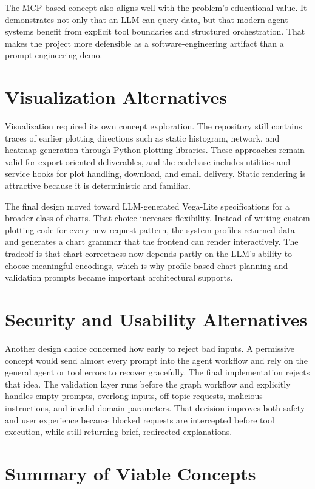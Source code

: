 \documentclass[12pt,oneside]{report}
\begin{document}
The MCP-based concept also aligns well with the problem's educational value. It demonstrates not only that an LLM can query data, but that modern agent systems benefit from explicit tool boundaries and structured orchestration. That makes the project more defensible as a software-engineering artifact than a prompt-engineering demo.

\section{Visualization Alternatives}

Visualization required its own concept exploration. The repository still contains traces of earlier plotting directions such as static histogram, network, and heatmap generation through Python plotting libraries. These approaches remain valid for export-oriented deliverables, and the codebase includes utilities and service hooks for plot handling, download, and email delivery. Static rendering is attractive because it is deterministic and familiar.

The final design moved toward LLM-generated Vega-Lite specifications for a broader class of charts. That choice increases flexibility. Instead of writing custom plotting code for every new request pattern, the system profiles returned data and generates a chart grammar that the frontend can render interactively. The tradeoff is that chart correctness now depends partly on the LLM's ability to choose meaningful encodings, which is why profile-based chart planning and validation prompts became important architectural supports.

\section{Security and Usability Alternatives}

Another design choice concerned how early to reject bad inputs. A permissive concept would send almost every prompt into the agent workflow and rely on the general agent or tool errors to recover gracefully. The final implementation rejects that idea. The validation layer runs before the graph workflow and explicitly handles empty prompts, overlong inputs, off-topic requests, malicious instructions, and invalid domain parameters. That decision improves both safety and user experience because blocked requests are intercepted before tool execution, while still returning brief, redirected explanations.

\section{Summary of Viable Concepts}
\end{document}
